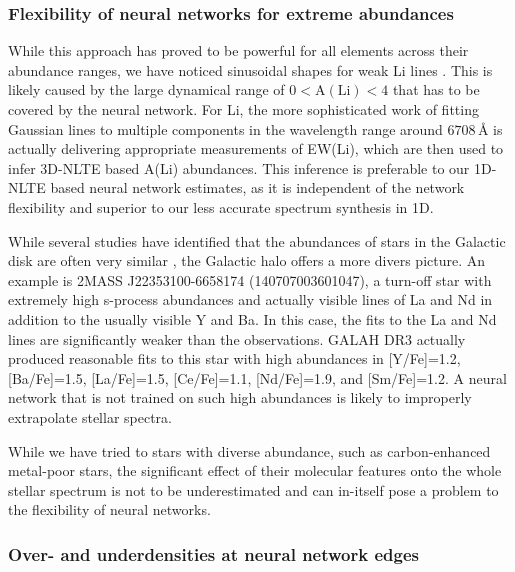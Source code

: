 \documentclass[
  journal=pasa,
  manuscript=research-paper, %
  year=2024,
  volume=37
]{cup-journal}
\begin{document}
\subsubsection{Flexibility of neural networks for extreme abundances}

While this approach has proved to be powerful for all elements across their abundance ranges, we have noticed sinusoidal shapes for weak Li lines \citep[see also][]{Wang2020}. This is likely caused by the large dynamical range of $0 < \mathrm{A(Li)} < 4$ that has to be covered by the neural network. For Li, the more sophisticated work of fitting Gaussian lines to multiple components in the wavelength range around $6708\,\text{\AA}$ is actually delivering appropriate measurements of EW(Li), which are then used to infer 3D-NLTE based A(Li) abundances. This inference is preferable to our 1D-NLTE based neural network estimates, as it is independent of the network flexibility and superior to our less accurate spectrum synthesis in 1D.

While several studies have identified that the abundances of stars in the Galactic disk are often very similar \citep[e.g.][]{Ness2019b}, the Galactic halo offers a more divers picture. An example is 2MASS J22353100-6658174 (140707003601047), a turn-off star with extremely high s-process abundances and actually visible lines of La and Nd in addition to the usually visible Y and Ba. In this case, the fits to the La and Nd lines are significantly weaker than the observations. GALAH DR3 actually produced reasonable fits to this star with high abundances in [Y/Fe]=1.2, [Ba/Fe]=1.5, [La/Fe]=1.5, [Ce/Fe]=1.1, [Nd/Fe]=1.9, and [Sm/Fe]=1.2. A neural network that is not trained on such high abundances is likely to improperly extrapolate stellar spectra.

While we have tried to stars with diverse abundance, such as carbon-enhanced metal-poor stars, the significant effect of their molecular features onto the whole stellar spectrum is not to be underestimated and can in-itself pose a problem to the flexibility of neural networks.

\subsubsection{Over- and underdensities at neural network edges}
\end{document}
